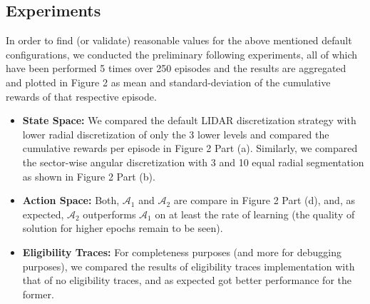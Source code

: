 \documentclass{article}
\begin{document}
\subsection{Experiments}
In order to find (or validate) reasonable values for the above mentioned default configurations, we conducted the preliminary following experiments, all of which have been performed 5 times over 250 episodes and the results are aggregated and plotted in Figure 2 as mean and standard-deviation of the cumulative rewards of that respective episode.
\begin{itemize}
\item {\bf State Space:} We compared the default LIDAR discretization strategy with lower radial discretization of only the 3 lower levels and compared the cumulative rewards per episode in Figure 2 Part (a). Similarly, we compared the sector-wise angular discretization with 3 and 10 equal radial segmentation as shown in Figure 2 Part (b).
\item {\bf Action Space: } Both, $\mathcal{A}_1$ and $\mathcal{A}_2$ are compare in Figure 2 Part (d), and, as expected, $\mathcal{A}_2$ outperforms $\mathcal{A}_1$ on at least the rate of learning (the quality of solution for higher epochs remain to be seen).
\item {\bf Eligibility Traces:} For completeness purposes (and more for debugging purposes), we compared the results of eligibility traces implementation with that of no eligibility traces, and as expected got better performance for the former.
\end{itemize}
\end{document}
